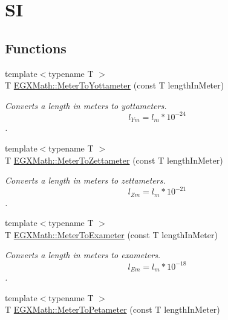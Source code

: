 \hypertarget{group___e_g_x_math-_conversions-_length_conversions-_s_i-_meter-_s_i}{}\section{SI}
\label{group___e_g_x_math-_conversions-_length_conversions-_s_i-_meter-_s_i}
\subsection*{Functions}
\begin{DoxyCompactItemize}
\item 
{\footnotesize template$<$typename T $>$ }\\T \mbox{\hyperlink{group___e_g_x_math-_conversions-_length_conversions-_s_i-_meter-_s_i_ga53fdb093b4572363a0ae9be4ced2ecb4}{E\+G\+X\+Math\+::\+Meter\+To\+Yottameter}} (const T length\+In\+Meter)
\begin{DoxyCompactList}\small\item\em Converts a length in meters to yottameters. \[ l_{Ym}=l_{m} * 10^{-24} \]. \end{DoxyCompactList}\item 
{\footnotesize template$<$typename T $>$ }\\T \mbox{\hyperlink{group___e_g_x_math-_conversions-_length_conversions-_s_i-_meter-_s_i_gafbd51e362ddfd28f270450693783f5c6}{E\+G\+X\+Math\+::\+Meter\+To\+Zettameter}} (const T length\+In\+Meter)
\begin{DoxyCompactList}\small\item\em Converts a length in meters to zettameters. \[ l_{Zm}=l_{m} * 10^{-21} \]. \end{DoxyCompactList}\item 
{\footnotesize template$<$typename T $>$ }\\T \mbox{\hyperlink{group___e_g_x_math-_conversions-_length_conversions-_s_i-_meter-_s_i_gadee48ed1b24c416ef0289dc4d803504b}{E\+G\+X\+Math\+::\+Meter\+To\+Exameter}} (const T length\+In\+Meter)
\begin{DoxyCompactList}\small\item\em Converts a length in meters to exameters. \[ l_{Em}=l_{m} * 10^{-18} \]. \end{DoxyCompactList}\item 
{\footnotesize template$<$typename T $>$ }\\T \mbox{\hyperlink{group___e_g_x_math-_conversions-_length_conversions-_s_i-_meter-_s_i_gaf808f7191ee069df013a26281f227388}{E\+G\+X\+Math\+::\+Meter\+To\+Petameter}} (const T length\+In\+Meter)

\end{DoxyCompactItemize}
